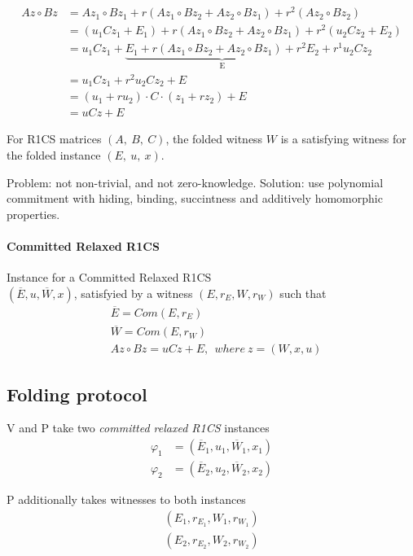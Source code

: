 \documentclass{article}
\theoremstyle{definition}
\begin{document}
\begin{align*}
	Az \circ Bz &= A z_1 \circ B z_1 + r(A z_1 \circ B z_2 + A z_2 \circ B z_1) + r^2 (A z_2 \circ B z_2)\\
		    &= (u_1 C z_1 + E_1) + r (A z_1 \circ B z_2 + A z_2 \circ B z_1) + r^2 (u_2 C z_2 + E_2)\\
		    &= u_1 C z_1 + \underbrace{E_1 + r(A z_1 \circ B z_2 + A z_2 \circ B z_1) + r^2 E_2}_\text{E} + r^1 u_2 C z_2\\
		    &= u_1 C z_1 + r^2 u_2 C z_2 + E\\
		    &= (u_1 + r u_2) \cdot C \cdot (z_1 + r z_2) + E\\
		    &= uCz + E
\end{align*}

For R1CS matrices $(A,~B,~C)$, the folded witness $W$ is a satisfying witness for the folded instance $(E,~u,~x)$.



\vspace{20px}
Problem: not non-trivial, and not zero-knowledge. Solution: use polynomial commitment with hiding, binding, succintness and additively homomorphic properties.

\paragraph{Committed Relaxed R1CS}
Instance for a Committed Relaxed R1CS\\
$(\overline{E}, u, \overline{W}, x)$, satisfyied by a witness $(E, r_E, W, r_W)$ such that
\begin{align*}
	&\overline{E} = Com(E, r_E)\\
	&\overline{W} = Com(E, r_W)\\
	&Az \circ Bz = uCz+E,~~ where~z=(W, x, u)
\end{align*}


\subsection{Folding protocol}

V and P take two \emph{committed relaxed R1CS} instances
\begin{align*}
	\varphi_1&=(\overline{E}_1, u_1, \overline{W}_1, x_1)\\
	\varphi_2&=(\overline{E}_2, u_2, \overline{W}_2, x_2)
\end{align*}

P additionally takes witnesses to both instances
\begin{align*}
	(E_1, r_{E_1}, W_1, r_{W_1})\\
	(E_2, r_{E_2}, W_2, r_{W_2})
\end{align*}
\end{document}
